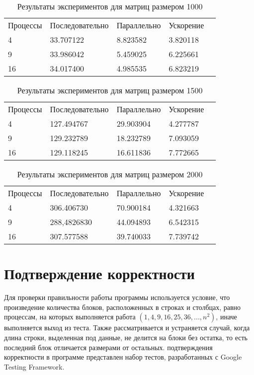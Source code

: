 \documentclass{report}
\begin{document}
\begin{table}[!h]
\caption{Результаты экспериментов для матриц размером 1000}
\centering
\begin{tabular}{lllll}
Процессы & Последовательно & Параллельно & Ускорение  \\
4        & 33.707122       & 8.823582    & 3.820118       \\
9        & 33.986042       & 5.459025    & 6.225661       \\
16       & 34.017400       & 4.985535    & 6.823219       
\end{tabular}
\end{table}

\begin{table}[!h]
\caption{Результаты экспериментов для матриц размером 1500}
\centering
\begin{tabular}{lllll}
Процессы & Последовательно & Параллельно & Ускорение  \\
4        & 127.494767      & 29.903904   & 4.277787       \\
9        & 129.232789      & 18.232789   & 7.093059       \\
16       & 129.118245      & 16.611836   & 7.772665      
\end{tabular}

\end{table}
\begin{table}[!h]
\caption{Результаты экспериментов для матриц размером 2000}
\centering
\begin{tabular}{lllll}
Процессы & Последовательно & Параллельно & Ускорение  \\
4        & 306.406730      & 70.900184   & 4.321663   \\
9        & 288,4826830     & 44.094893   & 6.542315       \\
16       & 307.577588      & 39.740033   & 7.739742       
\end{tabular}
\end{table}

\newpage

\section*{Подтверждение корректности}
Для проверки правильности работы программы используется условие, что произведение количества блоков, расположенных в строках и столбцах, равно процессам, на которых выполняется работа {\itshape $(1, 4, 9, 16, 25, 36, ..., n^2)$}, иначе выполняется выход из теста. Также рассматривается и устраняется случай, когда длина строки, выделенная под данные, не делится на блоки без остатка, то есть последний блок отличается размерами от остальных.
 подтверждения корректности в программе представлен набор тестов, разработанных с Google Testing Framework.
\newpage
\end{document}
